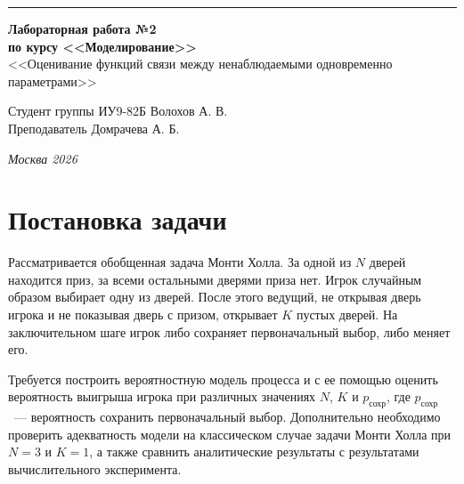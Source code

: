 \documentclass[a4paper, 14pt]{extarticle}
\begin{document}
\begin{titlepage}
\vspace*{-16pt}
\hspace{30pt}\rule{0.866\textwidth}{0.4pt}

\vspace{11em}

\begin{center}
\Large {\bf Лабораторная работа №2} \\ 
\large {\bf по курсу <<Моделирование>>} \\ 
\large <<Оценивание функций связи между ненаблюдаемыми одновременно параметрами>>
\end{center}\normalsize

\vspace{8em}

\begin{flushright}
  {Студент группы ИУ9-82Б Волохов А. В.\hspace*{15pt} \\
  \vspace{2ex}
  Преподаватель Домрачева А. Б.\hspace*{15pt}}
\end{flushright}

\bigskip

\vfill

\begin{center}
\textsl{Москва 2026}
\end{center}
\end{titlepage}

\setlength{\tabcolsep}{3pt}
\newpage
\setcounter{page}{2}

\section{Постановка задачи}

Рассматривается обобщенная задача Монти Холла. За одной из $N$ дверей находится приз, за всеми остальными дверями приза нет. Игрок случайным образом выбирает одну из дверей. После этого ведущий, не открывая дверь игрока и не показывая дверь с призом, открывает $K$ пустых дверей. На заключительном шаге игрок либо сохраняет первоначальный выбор, либо меняет его.

Требуется построить вероятностную модель процесса и с ее помощью оценить вероятность выигрыша игрока при различных значениях $N$, $K$ и $p_{\text{сохр}}$, где $p_{\text{сохр}}$~--- вероятность сохранить первоначальный выбор. Дополнительно необходимо проверить адекватность модели на классическом случае задачи Монти Холла при $N = 3$ и $K = 1$, а также сравнить аналитические результаты с результатами вычислительного эксперимента.
\end{document}
